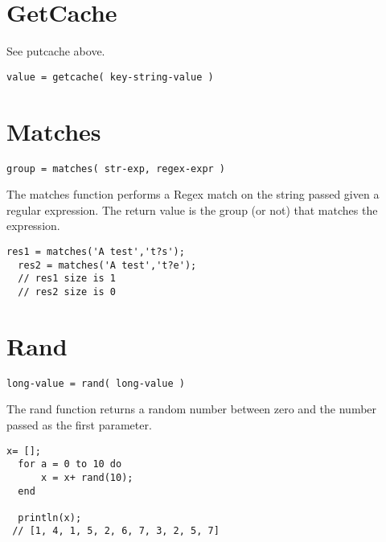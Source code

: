 \section{GetCache}
See putcache above.

\begin{Verbatim}
value = getcache( key-string-value )
\end{Verbatim}

\section{Matches}
\begin{Verbatim}
group = matches( str-exp, regex-expr )
\end{Verbatim}

The matches function performs a Regex match on the string passed given
a regular expression. The return value is the group (or not) that matches the expression.

\begin{lstlisting}[caption={matches example}]
  res1 = matches('A test','t?s');
  res2 = matches('A test','t?e');
  // res1 size is 1
  // res2 size is 0
\end{lstlisting}

\section{Rand}
\begin{Verbatim}
long-value = rand( long-value )
\end{Verbatim}

The rand function returns a random number between zero and the number passed as the
first parameter.

\begin{lstlisting}[caption={rand example}]
  x= [];
  for a = 0 to 10 do
      x = x+ rand(10);
  end

  println(x);
 // [1, 4, 1, 5, 2, 6, 7, 3, 2, 5, 7]
\end{lstlisting}
